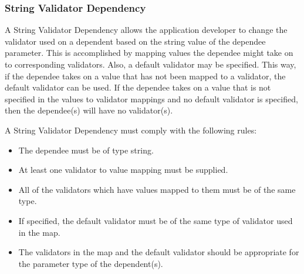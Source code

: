 \subsubsection{String Validator Dependency}
A String Validator Dependency allows the application developer to change the validator used on a dependent based on the string value of the dependee
parameter. This is accomplished by mapping values the dependee might take on to corresponding validators. Also, a default validator may be specified.
This way, if the dependee takes on a value that has not been mapped to a validator, the default validator can be used. If the dependee takes on a value
that is not specified in the values to validator mappings and no default validator is specified, then the dependee(s) will have no validator(s).

A String Validator Dependency must comply with the following rules:
\begin{itemize}
\item The dependee must be of type string.
\item At least one validator to value mapping must be supplied.
\item All of the validators which have values mapped to them must be of the same type.
\item If specified, the default validator must be of the same type of validator used in the map.
\item The validators in the map and the default validator should be appropriate for the parameter type of the dependent(s).
\end{itemize}

